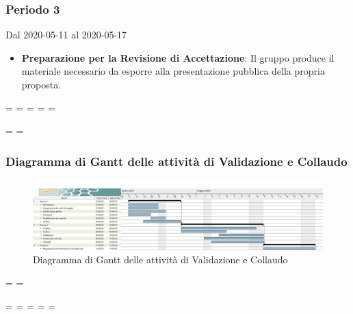 \subsubsection{Periodo 3} 
Dal 2020-05-11 al 2020-05-17
\begin{itemize}
	\item \textbf{Preparazione per la Revisione di Accettazione}: Il gruppo produce il materiale necessario da esporre alla presentazione pubblica della propria proposta.
\end{itemize}

\newpage
\paperwidth=\pdfpageheight
\paperheight=\pdfpagewidth
\pdfpageheight=\paperheight
\pdfpagewidth=\paperwidth
\headwidth=\textheight

\begingroup 
\vsize=\textwidth
\hsize=\textheight

\subsubsection{Diagramma di Gantt delle attività di Validazione e Collaudo}
\pagestyle{empty}
\begin{figure}[h]
	\centering
	\includegraphics[scale=0.40]{Sezioni/DiagrammiGantt/Validazione.png}
	\caption{Diagramma di Gantt delle attività di Validazione e Collaudo}
\end{figure}

\textwidth=\hsize
\textheight=\vsize

\endgroup
\newpage
\paperwidth=\pdfpageheight
\paperheight=\pdfpagewidth
\pdfpageheight=\paperheight
\pdfpagewidth=\paperwidth
\headwidth=\textwidth